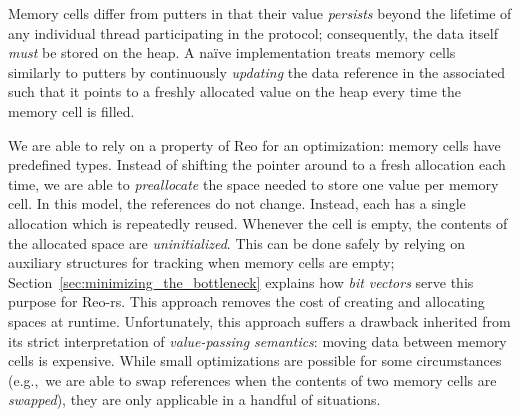 Memory cells differ from putters in that their value \textit{persists} beyond the lifetime of any individual thread participating in the protocol; consequently, the data itself \textit{must} be stored on the heap. A na\"ive implementation treats memory cells similarly to putters by continuously \textit{updating} the data reference in the associated  such that it points to a freshly allocated value on the heap every time the memory cell is filled.

We are able to rely on a property of Reo for an optimization: memory cells have predefined types. Instead of shifting the pointer around to a fresh allocation each time, we are able to \textit{preallocate} the space needed to store one value per memory cell. In this model, the references do not change. Instead, each has a single allocation which is repeatedly reused. Whenever the cell is empty, the contents of the allocated space are \textit{uninitialized}. This can be done safely by relying on auxiliary structures for tracking when memory cells are empty; Section~\ref{sec:minimizing_the_bottleneck} explains how \textit{bit vectors} serve this purpose for Reo-rs. This approach removes the cost of creating and allocating spaces at runtime. Unfortunately, this approach suffers a drawback inherited from its strict interpretation of \textit{value-passing semantics}: moving data between memory cells is expensive. While small optimizations are possible for some circumstances (e.g.,\ we are able to swap references when the contents of two memory cells are \textit{swapped}), they are only applicable in a handful of situations. 

